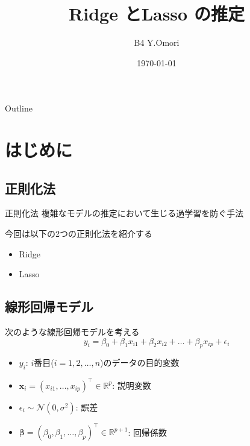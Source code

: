 \documentclass[dvipdfmx, 10pt]{beamer}
\title[]{Ridge とLasso の推定}
\author[Y.Omori]{B4 Y.Omori}
\date[\today]{\today}
\institute[NIT]{Nagoya Institute of Technology \\ Takeuchi \& Karasuyama Lab}
\begin{document}
\begin{frame}{}
\maketitle%
\thispagestyle{empty}%
\addtocounter{framenumber}{-1}%
\end{frame}
\begin{frame}{Outline}
\tableofcontents[hideallsubsections]
\end{frame}

\section{はじめに}
\subsection{正則化法}
\begin{frame}{\insertsubsection}
    \begin{block}{正則化法}
        複雑なモデルの推定において生じる過学習を防ぐ手法
    \end{block}
    \vspace{10pt}
        今回は以下の2つの正則化法を紹介する
    \begin{itemize}
        \item Ridge
      \item Lasso
    \end{itemize}
\end{frame}
\subsection{線形回帰モデル}
\begin{frame}{\insertsubsection}
    次のような線形回帰モデルを考える
    \begin{equation}
    	y_i=\beta_0 + \beta_1 x_{i1} + \beta_2  x_{i2} + \dots + \beta_p x_{ip} + \epsilon_i
    	\label{eq:linear_model_origin}
    \end{equation}    
    \begin{itemize}
        \item $y_i$: $i$番目($i = 1, 2, \dots, n$)のデータの目的変数
        \item $\bm{x}_i=(x_{i1}, \dots, x_{ip})^{\top} \in \mathbb{R}^p$: 説明変数
        \item $\epsilon_i \sim \mathcal{N}(0, \sigma^2)$: 誤差
        \item $\bm{\beta}=(\beta_0, \beta_1, \dots , \beta_p)^{\top} \in \mathbb{R}^{p+1}$: 回帰係数
    \end{itemize}
\end{frame}
\end{document}
